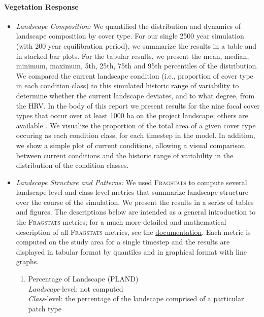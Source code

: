 \begin{itemize}
\end{itemize}

\paragraph{Vegetation Response} 

\begin{itemize}
\item \emph{Landscape Composition:} We quantified the distribution and dynamics of landscape composition by cover type. For our single 2500 year simulation (with 200 year equilibration period), we summarize the results in a table and in stacked bar plots. For the tabular results, we present the mean, median, minimum, maximum, 5th, 25th, 75th and 95th percentiles of the distribution. We compared the current landscape condition (i.e., proportion of cover type in each condition class) to this simulated historic range of variability to determine whether the current landscape deviates, and to what degree, from the HRV. In the body of this report we present results for the nine focal cover types that occur over at least 1000 ha on the project landscape; others are available . We visualize the proportion of the total area of a given cover type occuring as each condition class, for each timestep in the model. In addition, we show a simple plot of current conditions, allowing a visual comparison between current conditions and the historic range of variability in the distribution of the condition classes.

\item \emph{Landscape Structure and Patterns:} We used \textsc{Fragstats}  to compute several landscape-level and class-level metrics that summarize landscape structure over the course of the simulation. We present the results in a series of tables and figures. The descriptions below are intended as a general introduction to the \textsc{Fragstats} metrics; for a much more detailed and mathematical description of all \textsc{Fragstats} metrics, see the \href{http://www.umass.edu/landeco/research/fragstats/documents/fragstats.help.4.2.pdf}{documentation}. Each metric is computed on the study area for a single timestep and the results are displayed in tabular format by quantiles and in graphical format with line graphs.

	\begin{enumerate}
		\item Percentage of Landscape (PLAND)\\
		\emph{Landscape}-level: not computed\\
		\emph{Class}-level: the percentage of the landscape comprised of a particular patch type\\
		

\end{enumerate}
\end{itemize}
